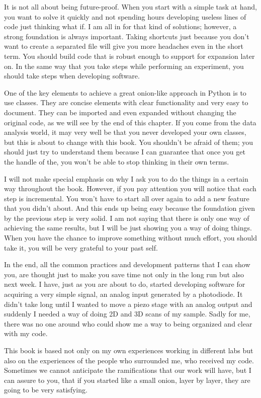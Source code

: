 It is not all about being future-proof. When you start with a simple task at hand, you want to solve it quickly and not spending hours developing useless lines of code just thinking what if. I am all in for that kind of solutions; however, a strong foundation is always important. Taking shortcuts just because you don’t want to create a separated file will give you more headaches even in the short term. You should build code that is robust enough to support for expansion later on. In the same way that you take steps while performing an experiment, you should take steps when developing software.

One of the key elements to achieve a great onion-like approach in Python is to use classes. They are concise elements with clear functionality and very easy to document. They can be imported and even expanded without changing the original code, as we will see by the end of this chapter. If you come from the data analysis world, it may very well be that you never developed your own classes, but this is about to change with this book. You shouldn’t be afraid of them; you should just try to understand them because I can guarantee that once you get the handle of the, you won’t be able to stop thinking in their own terms.

I will not make special emphasis on why I ask you to do the things in a certain way throughout the book. However, if you pay attention you will notice that each step is incremental. You won’t have to start all over again to add a new feature that you didn’t about. And this ends up being easy because the foundation given by the previous step is very solid. I am not saying that there is only one way of achieving the same results, but I will be just showing you a way of doing things. When you have the chance to improve something without much effort, you should take it, you will be very grateful to your past self.

In the end, all the common practices and development patterns that I can show you, are thought just to make you save time not only in the long run but also next week. I have, just as you are about to do, started developing software for acquiring a very simple signal, an analog input generated by a photodiode. It didn’t take long until I wanted to move a piezo stage with an analog output and suddenly I needed a way of doing 2D and 3D scans of my sample. Sadly for me, there was no one around who could show me a way to being organized and clear with my code.

This book is based not only on my own experiences working in different labs but also on the experiences of the people who surrounded me, who received my code. Sometimes we cannot anticipate the ramifications that our work will have, but I can assure to you, that if you started like a small onion, layer by layer, they are going to be very satisfying.

